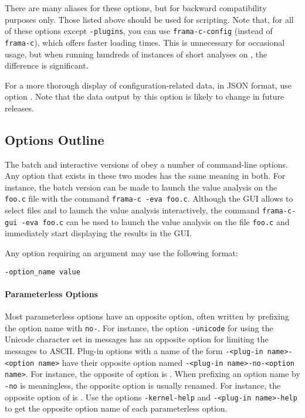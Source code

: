There are many aliases for these options, but for backward compatibility purposes only.
Those listed above should be used for scripting.
Note that, for all of these options except \texttt{-plugins},
you can use \texttt{frama-c-config} (instead of \texttt{frama-c}),
which offers faster loading times.
This is unnecessary for occasional usage, but when running hundreds of
instances of short analyses on \FramaC, the difference is significant.

For a more thorough display of configuration-related data, in JSON format,
use option . Note that the data output by this
option is likely to change in future releases.

\subsection{Options Outline}

The batch and interactive versions of \FramaC obey a number of
command-line options. Any option that exists in these two modes
has the same meaning in both.
For instance, the batch version can be made to launch the value analysis
on the \verb|foo.c| file with the command \verb|frama-c -eva foo.c|.
Although the GUI allows to select files and to
launch the value analysis interactively, the
command \verb|frama-c-gui -eva foo.c| can be used to launch the value
analysis on the file \verb|foo.c| and immediately start displaying the results
in the GUI.

Any option requiring an argument may use the following
format:
\begin{commands}
\texttt{-option\_name value}
\end{commands}

\paragraph{Parameterless Options}

Most parameterless options have an opposite option, often written by prefixing
the option name with \texttt{no-}.  For instance, the option \verb|-unicode|
for using the Unicode character set in messages has an opposite option
 for limiting the messages to ASCII.  Plug-in options
with
a name of the form \texttt{-<plug-in name>-<option name>} have their opposite
option named \texttt{-<plug-in name>-no-<option name>}. For instance, the
opposite of option  is . When
prefixing
an option name by \texttt{-no} is meaningless, the opposite option is usually
renamed. For instance, the opposite option of  is
. Use the options \texttt{-kernel-help} and
\texttt{-<plug-in name>-help} to get the opposite option name of each
parameterless option.

